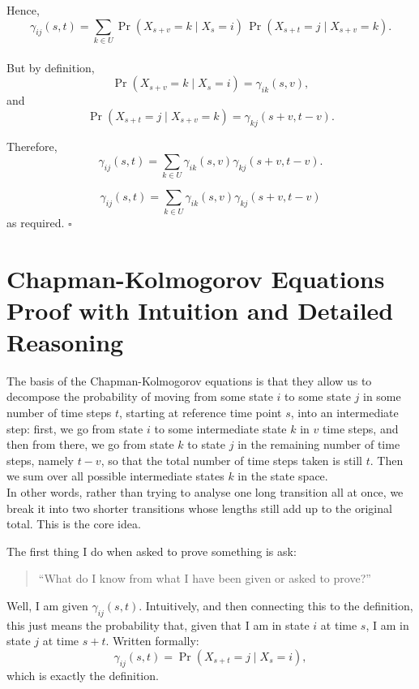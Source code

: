 \documentclass[12pt]{article}
\begin{document}
Hence,\\
\[
\gamma_{ij}(s,t)
=
\sum_{k\in U}
\Pr(X_{s+v}=k\mid X_s=i)\,
\Pr(X_{s+t}=j\mid X_{s+v}=k).
\]\\

But by definition,\\
\[
\Pr(X_{s+v}=k\mid X_s=i)=\gamma_{ik}(s,v),
\]
and
\[
\Pr(X_{s+t}=j\mid X_{s+v}=k)=\gamma_{kj}(s+v,t-v).
\]

Therefore,\\
\[
\gamma_{ij}(s,t)
=
\sum_{k\in U}\gamma_{ik}(s,v)\gamma_{kj}(s+v,t-v).
\]

\[
\boxed{
\gamma_{ij}(s,t)
=
\sum_{k\in U}\gamma_{ik}(s,v)\gamma_{kj}(s+v,t-v)
}
\]
as required. \hfill $\square$

\newpage

\section*{Chapman-Kolmogorov Equations Proof with Intuition and Detailed Reasoning}

The basis of the Chapman-Kolmogorov equations is that they allow us to decompose the probability of moving from some state $i$ to some state $j$ in some number of time steps $t$, starting at reference time point $s$, into an intermediate step: first, we go from state $i$ to some intermediate state $k$ in $v$ time steps, and then from there, we go from state $k$ to state $j$ in the remaining number of time steps, namely $t-v$, so that the total number of time steps taken is still $t$. Then we sum over all possible intermediate states $k$ in the state space.\\

In other words, rather than trying to analyse one long transition all at once, we break it into two shorter transitions whose lengths still add up to the original total. This is the core idea.\\

\vspace{0.3cm}

The first thing I do when asked to prove something is ask:\\

\begin{quote}
``What do I know from what I have been given or asked to prove?''
\end{quote}

Well, I am given $\gamma_{ij}(s,t)$. Intuitively, and then connecting this to the definition, this just means the probability that, given that I am in state $i$ at time $s$, I am in state $j$ at time $s+t$. Written formally:\\
\[
\gamma_{ij}(s,t)=\Pr(X_{s+t}=j\mid X_s=i),
\]
which is exactly the definition.
\end{document}
